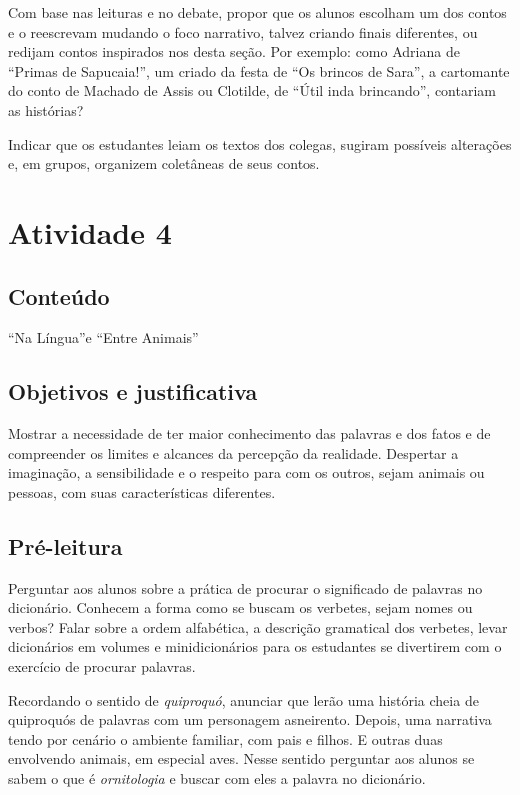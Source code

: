 Com base nas leituras e no debate, propor que os alunos escolham um dos
contos e o reescrevam mudando o foco narrativo, talvez criando finais
diferentes, ou redijam contos inspirados nos desta seção. Por exemplo:
como Adriana de ``Primas de Sapucaia!'', um criado da festa de ``Os
brincos de Sara'', a cartomante do conto de Machado de Assis ou
Clotilde, de ``Útil inda brincando'', contariam as histórias?

Indicar que os estudantes leiam os textos dos colegas, sugiram possíveis
alterações e, em grupos, organizem coletâneas de seus contos.

\section{Atividade 4}

\subsection{Conteúdo} ``Na Língua''e ``Entre Animais''

\subsection{Objetivos e justificativa}

Mostrar a necessidade de ter maior conhecimento das palavras e dos fatos
e de compreender os limites e alcances da percepção da realidade.
Despertar a imaginação, a sensibilidade e o respeito para com os outros,
sejam animais ou pessoas, com suas características diferentes.

\subsection{Pré-leitura}

Perguntar aos alunos sobre a prática de procurar o significado de
palavras no dicionário. Conhecem a forma como se buscam os verbetes,
sejam nomes ou verbos? Falar sobre a ordem alfabética, a descrição
gramatical dos verbetes, levar dicionários em volumes e minidicionários
para os estudantes se divertirem com o exercício de procurar palavras.

Recordando o sentido de \emph{quiproquó}, anunciar que lerão uma
história cheia de quiproquós de palavras com um personagem asneirento.
Depois, uma narrativa tendo por cenário o ambiente familiar, com pais e
filhos. E outras duas envolvendo animais, em especial aves. Nesse
sentido perguntar aos alunos se sabem o que é \emph{ornitologia} e
buscar com eles a palavra no dicionário.


